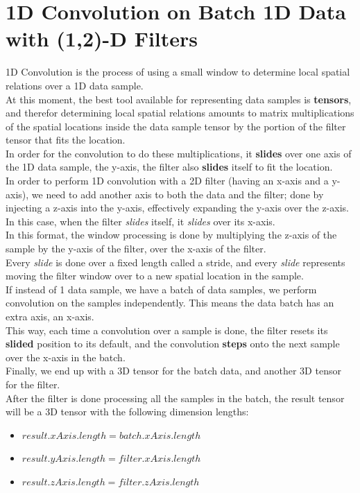 \documentclass[a4paper, 12pt]{report}
\begin{document}
\section{\textbf{1D Convolution on Batch 1D Data with (1,2)-D Filters}}
1D Convolution is the process of using a small window to determine local spatial relations over a 1D data sample.\\
At this moment, the best tool available for representing data samples is \textbf{tensors}, and therefor determining local spatial relations amounts to matrix multiplications of the spatial locations inside the data sample tensor by the portion of the filter tensor that fits the location.\\
In order for the convolution to do these multiplications, it \textbf{slides} over one axis of the 1D data sample, the y-axis, the filter also \textbf{slides} itself to fit the location.\\
In order to perform 1D convolution with a 2D filter (having an x-axis and a y-axis), we need to add another axis to both the data and the filter; done by injecting a z-axis into the y-axis, effectively expanding the y-axis over the z-axis. In this case, when the filter \textit{slides} itself, it \textit{slides} over its x-axis.\\
In this format, the window processing is done by multiplying the z-axis of the sample by the y-axis of the filter, over the x-axis of the filter.\\
Every \textit{slide} is done over a fixed length called a stride, and every \textit{slide} represents moving the filter window over to a new spatial location in the sample.\\
If instead of 1 data sample, we have a batch of data samples, we perform convolution on the samples independently. This means the data batch has an extra axis, an x-axis.\\
This way, each time a convolution over a sample is done, the filter resets its \textbf{slided} position to its default, and the convolution \textbf{steps} onto the next sample over the x-axis in the batch.\\
Finally, we end up with a 3D tensor for the batch data, and another 3D tensor for the filter.\\
After the filter is done processing all the samples in the batch, the result tensor will be a 3D tensor with the following dimension lengths:
\begin{itemize}[nosep]
	\item $ result.xAxis.length = batch.xAxis.length $
	\item $ result.yAxis.length = filter.xAxis.length $
	\item $ result.zAxis.length = filter.zAxis.length $
\end{itemize}
\end{document}
